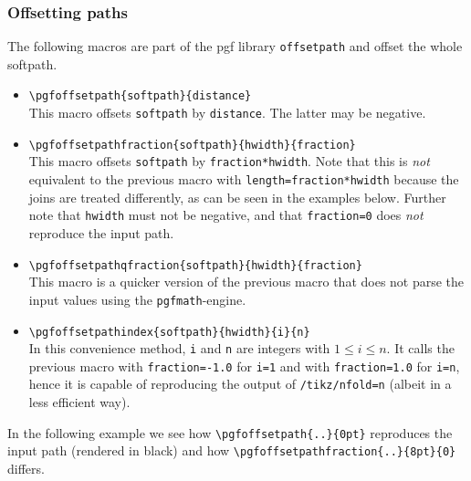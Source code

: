 \documentclass[12pt,a4paper]{article}
\theoremstyle{definition}
\begin{document}
\subsubsection{Offsetting paths}
The following macros are part of the pgf library \texttt{offsetpath} and offset the whole softpath.
\begin{itemize}
  \item \verb|\pgfoffsetpath{softpath}{distance}|\\%
    This macro offsets \texttt{softpath} by \texttt{distance}. The latter may be negative.
  \item \verb|\pgfoffsetpathfraction{softpath}{hwidth}{fraction}|\\%
    This macro offsets \texttt{softpath} by \texttt{fraction*hwidth}. Note that this is \emph{not} equivalent to the previous macro with \texttt{length=fraction*hwidth} because the joins are treated differently, as can be seen in the examples below. Further note that \texttt{hwidth} must not be negative, and that \texttt{fraction=0} does \emph{not} reproduce the input path.
  \item \verb|\pgfoffsetpathqfraction{softpath}{hwidth}{fraction}|\\%
    This macro is a quicker version of the previous macro that does not parse the input values using the \texttt{pgfmath}-engine.
  \item \verb|\pgfoffsetpathindex{softpath}{hwidth}{i}{n}|\\%
    In this convenience method, \texttt{i} and \texttt{n} are integers with $1 \leq i \leq n$. It calls the previous macro with \texttt{fraction=-1.0} for \texttt{i=1} and with \texttt{fraction=1.0} for \texttt{i=n}, hence it is capable of reproducing the output of \texttt{/tikz/nfold=n} (albeit in a less efficient way).
\end{itemize}
In the following example we see how \verb|\pgfoffsetpath{..}{0pt}| reproduces the input path (rendered in black) and how \verb|\pgfoffsetpathfraction{..}{8pt}{0}| differs.
\begin{tkzexample}[latex=4cm]
\end{tkzexample}
\end{document}
